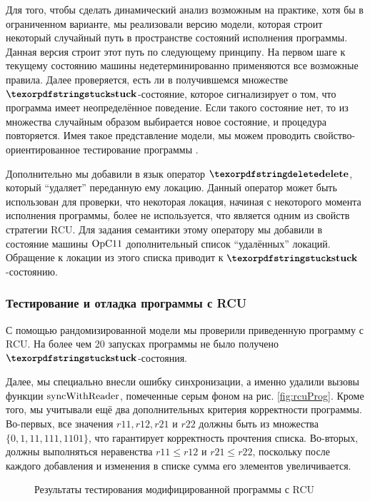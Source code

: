 Для того, чтобы сделать динамический анализ возможным на практике, хотя бы в ограниченном варианте,
мы реализовали версию модели, которая строит некоторый случайный путь в пространстве состояний исполнения программы.
Данная версия строит этот путь по следующему принципу.
На первом шаге к текущему состоянию машины недетерминированно применяются все возможные правила.
Далее проверяется, есть ли в получившемся множестве $\kw{stuck}$-состояние, которое сигнализирует о том, что
программа имеет неопределённое поведение. Если такого состояние нет, то из множества случайным образом выбирается
новое состояние, и процедура повторяется.
Имея такое представление модели, мы можем проводить свойство-ориентированное тестирование программы \cite{Hritcu-al:ICFP13}.

Дополнительно мы добавили в язык оператор $\kw{delete}$, который ``удаляет'' переданную ему локацию.
Данный оператор может быть использован для проверки, что некоторая локация, начиная с некоторого момента исполнения программы,
более не используется, что является одним из свойств стратегии RCU.
Для задания семантики этому оператору мы добавили в состояние машины $\mathrm{OpC11}$ дополнительный список ``удалённых'' локаций.
Обращение к локации из этого списка приводит к $\kw{stuck}$-состоянию.

\subsubsection{Тестирование и отладка программы с RCU}
С помощью рандомизированной модели мы проверили приведенную программу с RCU.
На более чем 20 запусках программы не было получено $\kw{stuck}$-состояния.

Далее, мы специально внесли ошибку синхронизации, а именно удалили вызовы функции ${\rm syncWithReader}$,
помеченные серым фоном на рис. \ref{fig:rcuProg}.
Кроме того, мы учитывали ещё два дополнительных критерия корректности программы.
Во-первых, все значения $r11, r12, r21$ и $r22$ должны быть из множества $\{0, 1, 11, 111, 1101\}$,
что гарантирует корректность прочтения списка.
Во-вторых, должны выполняться неравенства $r11 \le r12$ и $r21 \le r22$, поскольку после каждого добавления и
изменения в списке сумма его элементов увеличивается.

\begin{figure}
\centering
  
\caption{Результаты тестирования модифицированной программы с RCU}
\label{fig:tblRun}
\end{figure}

